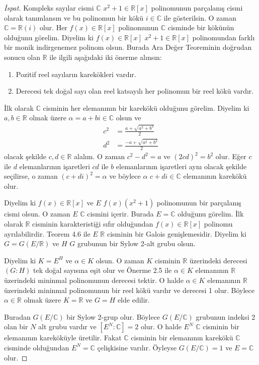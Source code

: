 \documentclass[draft]{article}
\theoremstyle{definition}
\theoremstyle{remark}
\begin{document}
    	    \begin{proof}[İspat]
    	        Kompleks sayılar cismi $\mathbb{C}$ $x^2 + 1 \in \mathbb{R}[x]$ polinomunun parçalanış cismi olarak tanımlansın ve bu polinomun bir kökü $i \in \mathbb{C}$ ile gösterilsin. O zaman $\mathbb{C} = \mathbb{R}(i)$ olur. Her $f(x) \in \mathbb{R}[x]$ polinomunun $\mathbb{C}$ cisminde bir kökünün olduğunu görelim. Diyelim ki $f(x) \in \mathbb{R}[x]$ $x^2 + 1 \in \mathbb{R}[x]$ polinomundan farklı bir monik indirgenemez polinom olsun. Burada Ara Değer Teoreminin doğrudan sonucu olan $\mathbb{R}$ ile ilgili aşağıdaki iki önerme alınsın:
    	        \begin{enumerate}
    				\renewcommand{\labelenumi}{(\roman{enumi})}
    				\item Pozitif reel sayıların karekökleri vardır.
    				\item Derecesi tek doğal sayı olan reel katsayılı her polinomun bir reel kökü vardır.
    			\end{enumerate} \par
    			İlk olarak $\mathbb{C}$ cisminin her elemanının bir karekökü olduğunu görelim. Diyelim ki $a, b \in \mathbb{R}$ olmak üzere $\alpha = a + bi \in \mathbb{C}$ olsun ve
    			\begin{align*}
    			    c^2 &= \frac{a + \sqrt{a^2 + b^2}}{2}\\
    			    d^2 &= \frac{-a + \sqrt{a^2 + b^2}}{2}
    			\end{align*}
    			olacak şekilde $c, d \in \mathbb{R}$ alalım. O zaman $c^2 - d^2 = a$ ve $(2cd)^2 = b^2$ olur. Eğer $c$ ile $d$ elemanlarının işaretleri $cd$ ile $b$ elemanlarının işaretleri aynı olacak şekilde seçilirse, o zaman $(c + di)^2 = \alpha$ ve böylece $\alpha$ $c + di \in \mathbb{C}$ elemanının karekökü olur.\par
    			Diyelim ki $f(x) \in \mathbb{R}[x]$ ve $E$ $f(x)(x^2 + 1)$ polinomunun bir parçalanış cismi olsun. O zaman $E$ $\mathbb{C}$ cismini içerir. Burada $E = \mathbb{C}$ olduğunu görelim. İlk olarak $\mathbb{R}$ cisminin karakteristiği sıfır olduğundan $f(x) \in \mathbb{R}[x]$ polinomu ayrılabilirdir. Teorem 4.6 ile $E$ $\mathbb{R}$ cisminin bir Galois genişlemesidir. Diyelim ki $G = G(E/\mathbb{R})$ ve $H$ $G$ grubunun bir Sylow 2-alt grubu olsun.\par
    			Diyelim ki $K = E^H$ ve $\alpha \in K$ olsun. O zaman $K$ cisminin $\mathbb{R}$ üzerindeki derecesi $(G : H)$ tek doğal sayısına eşit olur ve Önerme 2.5 ile $\alpha \in K$ elemanının $\mathbb{R}$ üzerindeki mininmal polinomunun derecesi tektir. O halde $\alpha \in K$ elemanının $\mathbb{R}$ üzerindeki mininmal polinomunun bir reel kökü vardır ve derecesi 1 olur. Böylece $\alpha \in \mathbb{R}$ olmak üzere $K = \mathbb{R}$ ve $G = H$ elde edilir.\par
    			Buradan $G(E/\mathbb{C})$ bir Sylow 2-grup olur. Böylece $G(E/\mathbb{C})$ grubunun indeksi 2 olan bir $N$ alt grubu vardır ve $[E^N : \mathbb{C}] = 2$ olur. O halde $E^N$ $\mathbb{C}$ cisminin bir elemanının kareköküyle üretilir. Fakat $\mathbb{C}$ cisminin bir elemanının karekökü $\mathbb{C}$ cisminde olduğundan $E^N = \mathbb{C}$ çelişkisine varılır. Öyleyse $G(E/\mathbb{C}) = 1$ ve $E = \mathbb{C}$ olur.
    	    \end{proof}
	        
\newpage

    \begin{thebibliography}{10}
    
    	\bibitem{}
    	
    \end{thebibliography}
	
\end{document}
